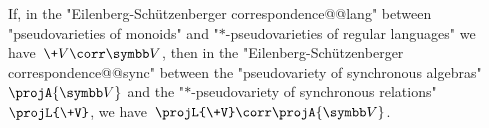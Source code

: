\begin{theorem}
	\AP\label{thm:lifting-theorem-monoids-pseudovarieties}
	If, in the "Eilenberg-Schützenberger correspondence@@lang"
	between "pseudovarieties of mon\-oids" and "$\ast$-pseudovarieties of regular languages"
	we have~$\+V \corr \B{V}$,
	then in the "Eilenberg-Schützenberger correspondence@@sync"
	between the "pseudovariety of synchronous algebras" $\projA{\B{V}}$ and
	the "$\ast$-pseudovariety of synchronous relations" $\projL{\+V}$,
	we have~$\projL{\+V} \corr \projA{\B{V}}$.
\end{theorem}
